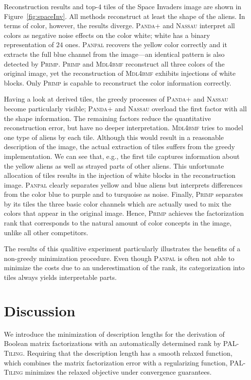 Reconstruction results and top-4 tiles of the Space Invaders image are shown in Figure~\ref{fig:spaceInv}. All methods reconstruct at least the shape of the aliens. In terms of color, however, the results diverge. \textsc{Panda+} and \textsc{Nassau} interpret all colors as negative noise effects on the color white; white has a binary representation of $24$ ones. \textsc{Panpal} recovers the yellow color correctly and it extracts the full blue channel from the image---an identical pattern is also detected by \textsc{Primp}. \textsc{Primp} and \textsc{Mdl4bmf} reconstruct all three colors of the original image, yet the reconstruction of \textsc{Mdl4bmf} exhibits injections of white blocks. Only \textsc{Primp} is capable to reconstruct the color information correctly. 

Having a look at derived tiles, the greedy processes of \textsc{Panda+} and \textsc{Nassau} become particularly visible; \textsc{Panda+} and \textsc{Nassau} overload the first factor with all the shape information. The remaining factors reduce the quantitative reconstruction error, but have no deeper interpretation. \textsc{Mdl4bmf} tries to model one type of aliens by each tile. Although this would result in a reasonable description of the image, the actual extraction of tiles suffers from the greedy implementation. We can see that, e.g., the first tile captures information about the yellow aliens as well as strayed parts of other aliens. This unfortunate allocation of tiles results in the injection of white blocks in the reconstruction image.  \textsc{Panpal} clearly separates yellow and blue aliens but interprets differences from the color blue to purple and to turquoise as noise. Finally, \textsc{Primp} separates by its tiles the three basic color channels which are actually used to mix the colors that appear in the original image. Hence, \textsc{Primp} achieves the factorization rank that corresponds to the natural amount of color concepts in the image, unlike all other competitors.

The results of this qualitive experiment particularly illustrates the benefits of a non-greedy minimization procedure. Even though \textsc{Panpal} is often not able to minimize the costs due to an underestimation of the rank, its categorization into tiles always yields interpretable parts.
\section{Discussion}
We introduce the minimization of description lengths for the derivation of Boolean matrix factorizations with an automatically determined rank by \textsc{PAL-Tiling}. Requiring that the description length has a smooth relaxed function, which combines the matrix factorization error with a regularizing function, \textsc{PAL-Tiling} minimizes the relaxed objective under convergence guarantees. %

